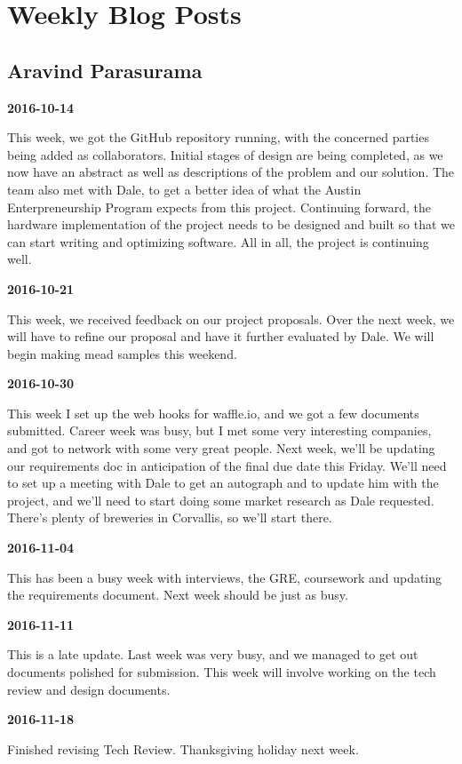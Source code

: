 \section{Weekly Blog Posts}
\subsection{Aravind Parasurama}

\textbf{2016-10-14}

This week, we got the GitHub repository running, with the concerned parties being added as collaborators. Initial stages of design are being completed, as we now have an abstract as well as descriptions of the problem and our solution. The team also met with Dale, to get a better idea of what the Austin Enterpreneurship Program expects from this project. Continuing forward, the hardware implementation of the project needs to be designed and built so that we can start writing and optimizing software. All in all, the project is continuing well.

\textbf{2016-10-21}

This week, we received feedback on our project proposals. Over the next week, we will have to refine our proposal and have it further evaluated by Dale. We will begin making mead samples this weekend.

\textbf{2016-10-30}

This week I set up the web hooks for waffle.io, and we got a few documents submitted. Career week was busy, but I met some very interesting companies, and got to network with some very great people. Next week, we'll be updating our requirements doc in anticipation of the final due date this Friday. We'll need to set up a meeting with Dale to get an autograph and to update him with the project, and we'll need to start doing some market research as Dale requested. There's plenty of breweries in Corvallis, so we'll start there.

\textbf{2016-11-04}

This has been a busy week with interviews, the GRE, coursework and updating the requirements document. Next week should be just as busy.

\textbf{2016-11-11}

This is a late update. Last week was very busy, and we managed to get out documents polished for submission. This week will involve working on the tech review and design documents.

\textbf{2016-11-18}

Finished revising Tech Review. Thanksgiving holiday next week.

